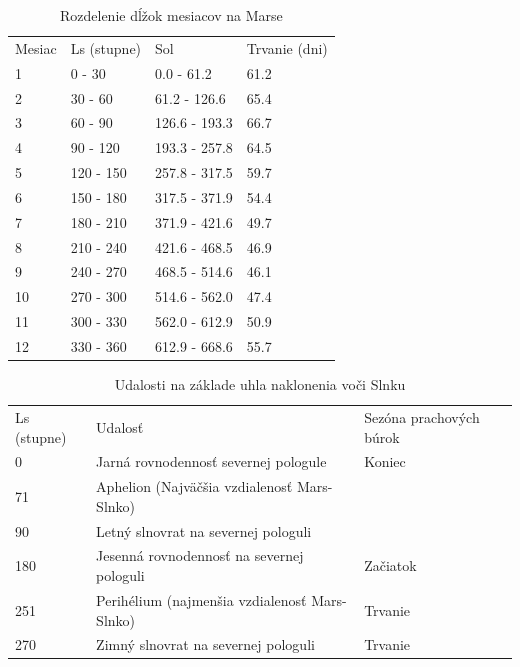 \begin{table}[!htbp]
\caption{Rozdelenie dĺžok mesiacov na Marse}
\centering
\begin{tabular}{llll}
Mesiac  & Ls (stupne)   & Sol            & Trvanie (dni)    \\
1       & 0 - 30        & 0.0 - 61.2     & 61.2             \\
2       & 30 - 60       & 61.2 - 126.6   & 65.4             \\
3       & 60 - 90       & 126.6 - 193.3  & 66.7             \\
4       & 90 - 120      & 193.3 - 257.8  & 64.5             \\
5       & 120 - 150     & 257.8 - 317.5  & 59.7             \\
6       & 150 - 180     & 317.5 - 371.9  & 54.4             \\
7       & 180 - 210     & 371.9 - 421.6  & 49.7             \\
8       & 210 - 240     & 421.6 - 468.5  & 46.9             \\
9       & 240 - 270     & 468.5 - 514.6  & 46.1             \\
10      & 270 - 300     & 514.6 - 562.0  & 47.4             \\
11      & 300 - 330     & 562.0 - 612.9  & 50.9             \\
12      & 330 - 360     & 612.9 - 668.6  & 55.7                                                     
\end{tabular}
\end{table}

\begin{table}[!htbp]
\caption{Udalosti na základe uhla naklonenia voči Slnku }
\centering
\begin{tabular}{lll}
Ls (stupne) & Udalosť                                       & Sezóna prachových búrok   \\
0           & Jarná rovnodennosť severnej pologule          & Koniec                    \\
71          & Aphelion (Najväčšia vzdialenosť Mars-Slnko)   &                           \\
90          & Letný slnovrat na severnej pologuli           &                           \\
180         & Jesenná rovnodennosť na severnej pologuli     & Začiatok                  \\
251         & Perihélium (najmenšia vzdialenosť Mars-Slnko) & Trvanie                   \\
270         & Zimný slnovrat na severnej pologuli           & Trvanie 
\end{tabular}
\end{table}


